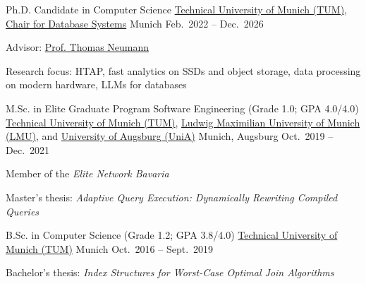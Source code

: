 \begin{cventries}
  \cventry
  {Ph.D. Candidate in Computer Science} %
  {\href{https://www.tum.de}{Technical University of Munich (TUM)}, \href{https://db.in.tum.de/}{Chair for Database Systems}} %
  {Munich} %
  {Feb.~2022 -- Dec.~2026} %
  {
    \begin{cvitems} %
      \item Advisor: \href{https://db.in.tum.de/~neumann/}{Prof. Thomas Neumann}
      \item Research focus: HTAP, fast analytics on SSDs and object storage, data processing on modern hardware, LLMs for databases
    \end{cvitems}
  }%

  \cventry
  {M.Sc. in Elite Graduate Program Software Engineering (Grade 1.0; GPA 4.0/4.0)} %
  {\href{https://www.tum.de}{Technical University of Munich (TUM)}, \href{https://www.lmu.de}{Ludwig Maximilian University of Munich (LMU)}, and \href{https://www.uni-augsburg.de}{University of Augsburg (UniA)}} %
  {Munich, Augsburg} %
  {Oct.~2019 -- Dec.~2021} %
  {
    \begin{cvitems} %
      \item {Member of the \emph{Elite Network Bavaria}}
      \item {Master's thesis: \emph{Adaptive Query Execution: Dynamically Rewriting Compiled Queries}}
    \end{cvitems}
  }%

  \cventry
  {B.Sc. in Computer Science (Grade 1.2; GPA 3.8/4.0)} %
  {\href{https://www.tum.de}{Technical University of Munich (TUM)}} %
  {Munich} %
  {Oct.~2016 -- Sept.~2019} %
  {
    \begin{cvitems} %
      \item {Bachelor's thesis: \emph{Index Structures for Worst-Case Optimal Join Algorithms}}
    \end{cvitems}
  }%
\end{cventries}
